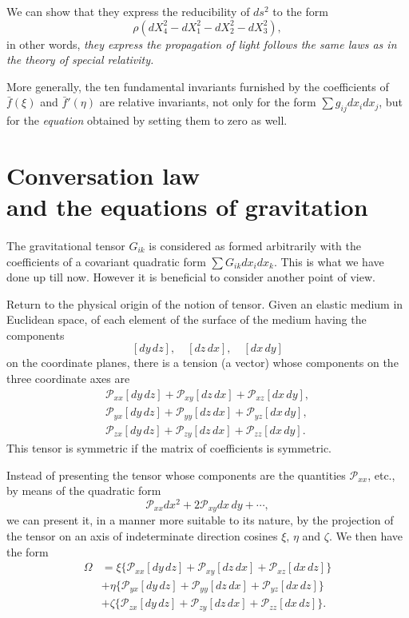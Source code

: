 \documentclass[leqno,12pt]{article}
\theoremstyle{shape1}
\theoremstyle{shape0}
\theoremstyle{shape2}
\theoremstyle{definition}
\begin{document}
We can show that they express the reducibility of $ds^{2}$ to the form
\[
\rho(dX^{2}_{4}-dX^{2}_{1}-dX^{2}_{2}-dX^{2}_{3}),
\]
in other words, \emph{they express the propagation of light follows the same laws as in the theory of special relativity.}

More generally, the ten fundamental invariants furnished by the coefficients of $\bar f(\xi)$ and $\bar f'(\eta)$ are relative invariants, not only for the form $\sum g_{ij}dx_{i}dx_{j}$, but for the \emph{equation} obtained by setting them to zero as well.

\section[{Conversation law and the equations of gravitation}]{Conversation law\\and the equations of gravitation}
\label{sec:conv-law-equat}

\paragraph{}
\label{sec:35}
The gravitational tensor $G_{ik}$ is considered as formed arbitrarily with the coefficients of a covariant quadratic form $\sum G_{ik}dx_{i}dx_{k}$. This is what we have done up till now. However it is beneficial to consider another point of view.

Return to the physical origin of the notion of tensor. Given an elastic medium in Euclidean space, of each element of the surface of the medium having the components
\[
[dy\,dz],\quad[dz\,dx],\quad[dx\,dy]
\]
on the coordinate planes, there is a tension (a vector) whose components on the three coordinate axes are
\begin{gather*}
  \mathcal{P}_{xx}[dy\,dz]+\mathcal{P}_{xy}[dz\,dx]+\mathcal{P}_{xz}[dx\,dy],\\
  \mathcal{P}_{yx}[dy\,dz]+\mathcal{P}_{yy}[dz\,dx]+\mathcal{P}_{yz}[dx\,dy],\\
  \mathcal{P}_{zx}[dy\,dz]+\mathcal{P}_{zy}[dz\,dx]+\mathcal{P}_{zz}[dx\,dy].
\end{gather*}
This tensor is symmetric if the matrix of coefficients is symmetric.

Instead of presenting the tensor whose components are the quantities $\mathcal{P}_{xx}$, etc., by means of the quadratic form
\[
\mathcal{P}_{xx}dx^{2}+2\mathcal{P}_{xy}dx\,dy+\cdots,
\]
we can present it, in a manner more suitable to its nature, by the projection of the tensor on an axis of indeterminate direction cosines $\xi$, $\eta$ and $\zeta$. We then have the form
\begin{align*}
  \Omega&=\xi\{\mathcal{P}_{xx}[dy\,dz]+\mathcal{P}_{xy}[dz\,dx]+\mathcal{P}_{xz}[dx\,dz]\}\\
  &+\eta\{\mathcal{P}_{yx}[dy\,dz]+\mathcal{P}_{yy}[dz\,dx]+\mathcal{P}_{yz}[dx\,dz]\}\\
  &+\zeta\{\mathcal{P}_{zx}[dy\,dz]+\mathcal{P}_{zy}[dz\,dx]+\mathcal{P}_{zz}[dx\,dz]\}.\\
\end{align*}
\end{document}
